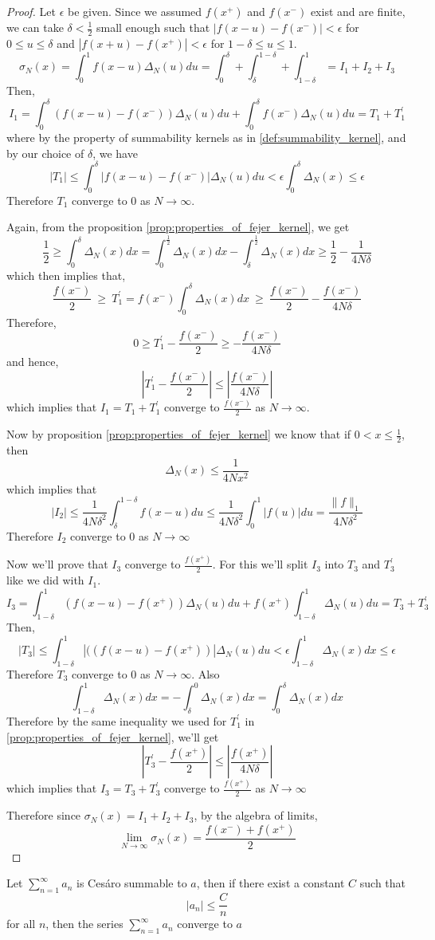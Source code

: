   \begin{proof}
    Let $\epsilon$ be given. Since we assumed $f(x^+)$ and $f(x^-)$ exist and are finite, we can take $\delta < \frac{1}{2}$ small enough such that $|f(x-u) - f(x^-)| < \epsilon$ for $0\le u \le \delta$ and $|f(x+u) - f(x^+)| < \epsilon$ for $1-\delta \le u \le 1$.
    $$ \sigma_N(x) = \int_0^1 f(x-u)\Delta_N(u) du = \int_{0}^\delta + \int_\delta^{1-\delta} + \int_{1-\delta}^1 = I_1 + I_2 + I_3$$
    Then, 
    $$I_1 = \int_0^\delta (f(x-u) - f(x^-))\Delta_N(u)du + \int_0^\delta f(x^-)\Delta_N(u)du = T_1 + T_1^{'}$$
    where by the property of summability kernels as in \ref{def:summability_kernel}, and by our choice of $\delta$, we have
    $$|T_1| \le \int_0^\delta |f(x-u) - f(x^-)|\Delta_N(u)du < \epsilon \int_0^\delta \Delta_N(x) \le \epsilon$$
    Therefore $T_1$ converge to $0$ as $N \to \infty$.

    Again, from the proposition \ref{prop:properties_of_fejer_kernel}, we get
    $$\frac{1}{2} \ge \int_0^\delta \Delta_N(x) dx = \int_0^{\frac{1}{2}} \Delta_N(x) dx - \int_\delta^{\frac{1}{2}} \Delta_N(x) dx \ge \frac{1}{2} - \frac{1}{4N\delta}$$
    which then implies that, 
    $$\frac{f(x^-)}{2} \ \ge \ T_1^{'} = f(x^-)\int_0^\delta \Delta_N(x) dx \ \ge \ \frac{f(x^-)}{2} - \frac{f(x^-)}{4N\delta}  $$
    Therefore, 
    $$ 0\ge T_1^{'} - \frac{f(x^-)}{2} \ge -\frac{f(x^-)}{4N\delta} $$
    and hence, 
    $$\left| T_1^{'} - \frac{f(x^-)}{2}\right| \le \left|\frac{f(x^-)}{4N\delta}\right| $$
    which implies that $I_1 = T_1 + T_1^{'}$ converge to $\frac{f(x^-)}{2}$ as $N \to \infty$.

    Now by proposition \ref{prop:properties_of_fejer_kernel} we know that if $0 < x \le \frac{1}{2}$, then $$\Delta_N(x) \le \frac{1}{4Nx^2}$$ which implies that 
    $$ |I_2| \le \frac{1}{4N\delta^2}\int_\delta^{1-\delta}f(x-u) du \le \frac{1}{4N\delta^2}\int_0^1|f(u)|du = \frac{\|f\|_1}{4N\delta^2}$$
    Therefore $I_2$ converge to $0$ as $N \to \infty$

    Now we'll prove that $I_3$ converge to $\frac{f(x^+)}{2}$. For this we'll split $I_3$ into $T_3$ and $T_3^{'}$ like we did with $I_1$. 
    $$I_3 = \int_{1-\delta}^1 (f(x-u) - f(x^+))\Delta_N(u) du + f(x^+)\int_{1-\delta}^{1}\Delta_N(u) du = T_3 + T_3^{'}$$
    Then, 
    $$|T_3| \le \int_{1-\delta}^1 |((f(x-u) - f(x^+))|\Delta_N(u)du < \epsilon \int_{1-\delta}^1 \Delta_N(x) dx \le \epsilon$$
    Therefore $T_3$ converge to $0$ as $N \to \infty$.
    Also
      $$\int_{1-\delta}^1 \Delta_N(x) dx = -\int_{\delta}^0 \Delta_N(x) dx = \int_0^\delta \Delta_N(x) dx$$
      Therefore by the same inequality we used for $T_1^{'}$ in \ref{prop:properties_of_fejer_kernel}, we'll get
      $$ \left| T_3^{'} - \frac{f(x^+)}{2} \right| \le \left|\frac{f(x^+)}{4N\delta} \right|$$
      which implies that $I_3 = T_3 + T_3^{'}$ converge to $\frac{f(x^+)}{2}$ as $N \to \infty$

    Therefore since $\sigma_N(x) = I_1 + I_2 + I_3$, by the algebra of limits, 
    $$ \lim_{N \to \infty} \sigma_N(x) = \frac{f(x^-) + f(x^+)}{2}$$
  \end{proof}

 \begin{theorem}
   Let $\sum_{n=1}^\infty a_n$ is Ces\'aro summable to $a$, then if there exist a constant $C$ such that $$|a_n| \le \frac{C}{n}$$ for all $n$, then the series $\sum_{n=1}^\infty a_n$ converge to $a$
 \end{theorem}
